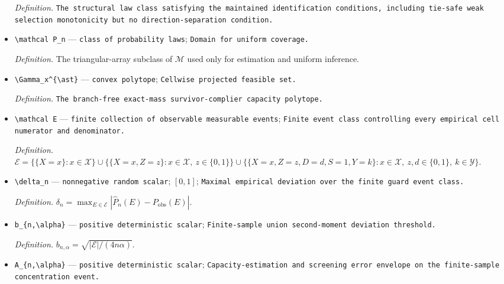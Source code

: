 \documentclass{article}
\begin{document}
\begin{itemize}
  \par\smallskip\noindent\emph{Definition.} \texttt{The structural law class satisfying the maintained identification conditions,\allowbreak{} including tie-\allowbreak{}safe weak selection monotonicity but no direction-\allowbreak{}separation condition.}
  \item \texttt{\textbackslash{}\allowbreak{}mathcal P\_\allowbreak{}n} --- \texttt{class of probability laws}; \texttt{Domain for uniform coverage.}
  \par\smallskip\noindent\emph{Definition.} The triangular-array subclass of \(\mathcal M\) used only for estimation and uniform inference.
  \item \texttt{\textbackslash{}\allowbreak{}Gamma\_\allowbreak{}x\textasciicircum{}\{\textbackslash{}\allowbreak{}ast\}\allowbreak{}} --- \texttt{convex polytope}; \texttt{Cellwise projected feasible set.}
  \par\smallskip\noindent\emph{Definition.} \texttt{The branch-\allowbreak{}free exact-\allowbreak{}mass survivor-\allowbreak{}complier capacity polytope.}
  \item \texttt{\textbackslash{}\allowbreak{}mathcal E} --- \texttt{finite collection of observable measurable events}; \texttt{Finite event class controlling every empirical cell numerator and denominator.}
  \par\smallskip\noindent\emph{Definition.} \(\mathcal E=\bigl\{\{X=x\}:x\in\mathcal X\bigr\}\cup\bigl\{\{X=x,Z=z\}:x\in\mathcal X,\ z\in\{0,1\}\bigr\}\cup\bigl\{\{X=x,Z=z,D=d,S=1,Y=k\}:x\in\mathcal X,\ z,d\in\{0,1\},\ k\in\mathcal Y\bigr\}.\)
  \item \texttt{\textbackslash{}\allowbreak{}delta\_\allowbreak{}n} --- \texttt{nonnegative random scalar}; \([0,1]\); \texttt{Maximal empirical deviation over the finite guard event class.}
  \par\smallskip\noindent\emph{Definition.} \(\delta_n=\max_{E\in\mathcal E}|\widehat P_n(E)-P_{\mathrm{obs}}(E)|.\)
  \item \texttt{b\_\allowbreak{}\{n,\allowbreak{}\textbackslash{}\allowbreak{}alpha\}\allowbreak{}} --- \texttt{positive deterministic scalar}; \texttt{Finite-\allowbreak{}sample union second-\allowbreak{}moment deviation threshold.}
  \par\smallskip\noindent\emph{Definition.} \(b_{n,\alpha}=\sqrt{|\mathcal E|/(4n\alpha)}.\)
  \item \texttt{A\_\allowbreak{}\{n,\allowbreak{}\textbackslash{}\allowbreak{}alpha\}\allowbreak{}} --- \texttt{positive deterministic scalar}; \texttt{Capacity-\allowbreak{}estimation and screening error envelope on the finite-\allowbreak{}sample concentration event.}

\end{itemize}
\end{document}
